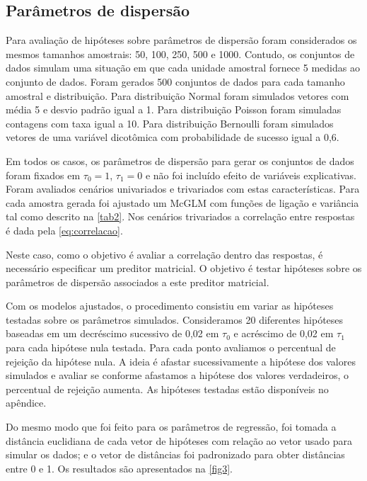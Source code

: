 \documentclass[AMA,STIX1COL]{WileyNJD-v2}
\begin{document}
\subsection{Parâmetros de dispersão}

Para avaliação de hipóteses sobre parâmetros de dispersão foram considerados os mesmos tamanhos amostrais: 50, 100, 250, 500 e 1000. Contudo, os conjuntos de dados simulam uma situação em que cada unidade amostral fornece 5 medidas ao conjunto de dados. Foram gerados 500 conjuntos de dados para cada tamanho amostral e distribuição. Para distribuição Normal foram simulados vetores com média 5 e desvio padrão igual a 1. Para distribuição Poisson foram simuladas contagens com taxa igual a 10. Para distribuição Bernoulli foram simulados vetores de uma variável dicotômica com probabilidade de sucesso igual a 0,6.

Em todos os casos, os parâmetros de dispersão para gerar os conjuntos de dados foram fixados em $\tau_0 = 1$, $\tau_1 = 0$ e não foi incluído efeito de variáveis explicativas. Foram avaliados cenários univariados e trivariados com estas características. Para cada amostra gerada foi ajustado um McGLM com funções de ligação e variância tal como descrito na \autoref{tab2}. Nos cenários trivariados a correlação entre respostas é dada pela \autoref{eq:correlacao}.

Neste caso, como o objetivo é avaliar a correlação dentro das respostas, é necessário especificar um preditor matricial. O objetivo é testar hipóteses sobre os parâmetros de dispersão associados a este preditor matricial. 

Com os modelos ajustados, o procedimento consistiu em variar as hipóteses testadas sobre os parâmetros simulados. Consideramos 20 diferentes hipóteses baseadas em um decréscimo sucessivo de 0,02 em $\tau_0$ e acréscimo de 0,02 em $\tau_1$ para cada hipótese nula testada. Para cada ponto avaliamos o percentual de rejeição da hipótese nula. A ideia é afastar sucessivamente a hipótese dos valores simulados e avaliar se conforme afastamos a hipótese dos valores verdadeiros, o percentual de rejeição aumenta. As hipóteses testadas estão disponíveis no apêndice.

Do mesmo modo que foi feito para os parâmetros de regressão, foi tomada a distância euclidiana de cada vetor de hipóteses com relação ao vetor usado para simular os dados; e o vetor de distâncias foi padronizado para obter distâncias entre 0 e 1. Os resultados são apresentados na \autoref{fig3}.
\end{document}
